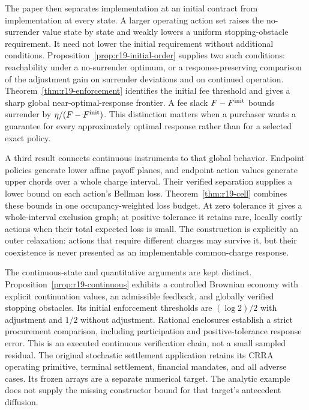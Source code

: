 The paper then separates implementation at an initial contract from implementation at every state. A larger operating action set raises the no-surrender value state by state and weakly lowers a uniform stopping-obstacle requirement. It need not lower the initial requirement without additional conditions. Proposition~\ref{prop:r19-initial-order} supplies two such conditions: reachability under a no-surrender optimum, or a response-preserving comparison of the adjustment gain on surrender deviations and on continued operation. Theorem~\ref{thm:r19-enforcement} identifies the initial fee threshold and gives a sharp global near-optimal-response frontier. A fee slack $F-F^{\rm init}$ bounds surrender by $\eta/(F-F^{\rm init})$. This distinction matters when a purchaser wants a guarantee for every approximately optimal response rather than for a selected exact policy.

A third result connects continuous instruments to that global behavior. Endpoint policies generate lower affine payoff planes, and endpoint action values generate upper chords over a whole charge interval. Their verified separation supplies a lower bound on each action's Bellman loss. Theorem~\ref{thm:r19-cell} combines these bounds in one occupancy-weighted loss budget. At zero tolerance it gives a whole-interval exclusion graph; at positive tolerance it retains rare, locally costly actions when their total expected loss is small. The construction is explicitly an outer relaxation: actions that require different charges may survive it, but their coexistence is never presented as an implementable common-charge response.

The continuous-state and quantitative arguments are kept distinct. Proposition~\ref{prop:r19-continuous} exhibits a controlled Brownian economy with explicit continuation values, an admissible feedback, and globally verified stopping obstacles. Its initial enforcement thresholds are $(\log2)/2$ with adjustment and $1/2$ without adjustment. Rational enclosures establish a strict procurement comparison, including participation and positive-tolerance response error. This is an executed continuous verification chain, not a small sampled residual. The original stochastic settlement application retains its CRRA operating primitive, terminal settlement, financial mandates, and all adverse cases. Its frozen arrays are a separate numerical target. The analytic example does not supply the missing constructor bound for that target's antecedent diffusion.

